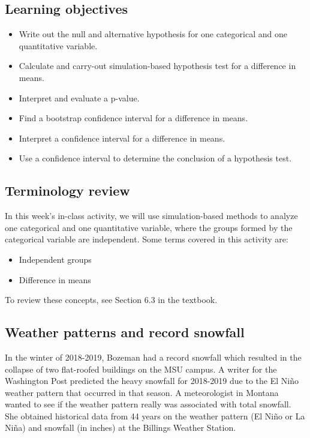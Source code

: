 \documentclass[
]{report}
\newcommand\latexcode[1]{#1}
\begin{document}
\hypertarget{learning-objectives-6}{%
\subsection{Learning objectives}\label{learning-objectives-6}}

\begin{itemize}
\item
  Write out the null and alternative hypothesis for one categorical and one quantitative variable.
\item
  Calculate and carry-out simulation-based hypothesis test for a difference in means.
\item
  Interpret and evaluate a p-value.
\item
  Find a bootstrap confidence interval for a difference in means.
\item
  Interpret a confidence interval for a difference in means.
\item
  Use a confidence interval to determine the conclusion of a hypothesis test.
\end{itemize}

\hypertarget{terminology-review-10}{%
\subsection{Terminology review}\label{terminology-review-10}}

In this week's in-class activity, we will use simulation-based methods to analyze one categorical and one quantitative variable, where the groups formed by the categorical variable are independent. Some terms covered in this activity are:

\begin{itemize}
\item
  Independent groups
\item
  Difference in means
\end{itemize}

To review these concepts, see Section 6.3 in the textbook.

\hypertarget{weather-patterns-and-record-snowfall}{%
\subsection{Weather patterns and record snowfall}\label{weather-patterns-and-record-snowfall}}

In the winter of 2018-2019, Bozeman had a record snowfall which resulted in the collapse of two flat-roofed buildings on the MSU campus. A writer for the Washington Post predicted the heavy snowfall for 2018-2019 due to the El Ni\latexcode{\~{n}}o weather pattern that occurred in that season. A meteorologist in Montana wanted to see if the weather pattern really was associated with total snowfall. She obtained historical data from 44 years on the weather pattern (El Ni\latexcode{\~{n}}o or La Ni\latexcode{\~{n}}a) and snowfall (in inches) at the Billings Weather Station.
\end{document}
